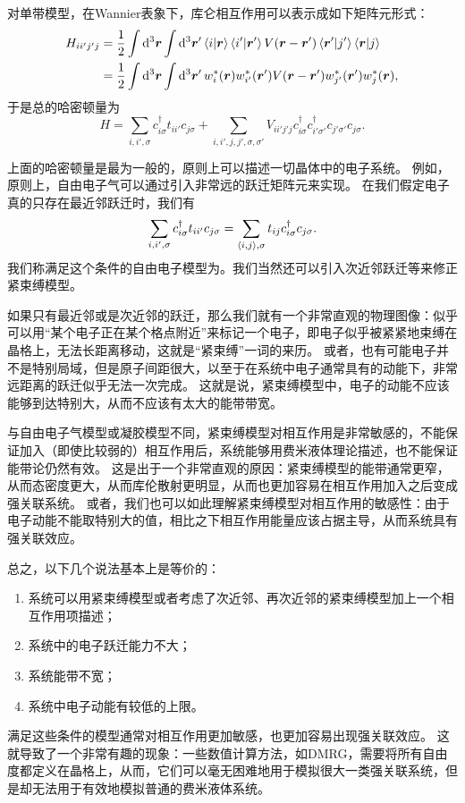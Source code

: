 对单带模型，在Wannier表象下，库仑相互作用可以表示成如下矩阵元形式：
\begin{equation}
    \begin{aligned}
        H_{i i' j' j} &= \frac{1}{2} \int \dd[3]{\vb*{r}} \int \dd[3]{\vb*{r}'} \braket{i}{\vb*{r}} \braket{i'}{\vb*{r}'} V(\vb*{r} - \vb*{r}') \braket{\vb*{r}'}{j'} \braket{\vb*{r}}{j} \\
        &= \frac{1}{2} \int \dd[3]{\vb*{r}} \int \dd[3]{\vb*{r}'} w_i^*(\vb*{r}) w_{i'}^*(\vb*{r}') V(\vb*{r} - \vb*{r}') w_{j'}^*(\vb*{r}') w_j^*(\vb*{r}),
    \end{aligned}
    \label{eq:wannier-basis-interaction}
\end{equation}
于是总的哈密顿量为
\begin{equation}
    H = \sum_{i, i', \sigma} c^\dagger_{i \sigma} t_{i i'} c_{j \sigma} + \sum_{i, i', j, j', \sigma, \sigma'} V_{i i' j' j} c^\dagger_{i \sigma} c^\dagger_{i' \sigma'} c_{j' \sigma'} c_{j \sigma}.
\end{equation}

上面的哈密顿量是最为一般的，原则上可以描述一切晶体中的电子系统。
例如，原则上，自由电子气可以通过引入非常远的跃迁矩阵元来实现。
在我们假定电子真的只存在最近邻跃迁时，我们有
\begin{equation}
    \sum_{i, i', \sigma} c^\dagger_{i \sigma} t_{i i'} c_{j \sigma} = \sum_{\langle i, j \rangle, \sigma} t_{ij} c^\dagger_{i \sigma} c_{j \sigma}.
\end{equation}
我们称满足这个条件的自由电子模型为。我们当然还可以引入次近邻跃迁等来修正紧束缚模型。

如果只有最近邻或是次近邻的跃迁，那么我们就有一个非常直观的物理图像：似乎可以用“某个电子正在某个格点附近”来标记一个电子，即电子似乎被紧紧地束缚在晶格上，无法长距离移动，这就是“紧束缚”一词的来历。
或者，也有可能电子并不是特别局域，但是原子间距很大，以至于在系统中电子通常具有的动能下，非常远距离的跃迁似乎无法一次完成。
这就是说，紧束缚模型中，电子的动能不应该能够到达特别大，从而不应该有太大的能带带宽。

与自由电子气模型或凝胶模型不同，紧束缚模型对相互作用是非常敏感的，不能保证加入（即使比较弱的）相互作用后，系统能够用费米液体理论描述，也不能保证能带论仍然有效。
这是出于一个非常直观的原因：紧束缚模型的能带通常更窄，从而态密度更大，从而库伦散射更明显，从而也更加容易在相互作用加入之后变成强关联系统。
或者，我们也可以如此理解紧束缚模型对相互作用的敏感性：由于电子动能不能取特别大的值，相比之下相互作用能量应该占据主导，从而系统具有强关联效应。

总之，以下几个说法基本上是等价的：
\begin{enumerate}
    \item 系统可以用紧束缚模型或者考虑了次近邻、再次近邻的紧束缚模型加上一个相互作用项描述；
    \item 系统中的电子跃迁能力不大；
    \item 系统能带不宽；
    \item 系统中电子动能有较低的上限。
\end{enumerate}
满足这些条件的模型通常对相互作用更加敏感，也更加容易出现强关联效应。
这就导致了一个非常有趣的现象：一些数值计算方法，如DMRG，需要将所有自由度都定义在晶格上，从而，它们可以毫无困难地用于模拟很大一类强关联系统，但是却无法用于有效地模拟普通的费米液体系统。

